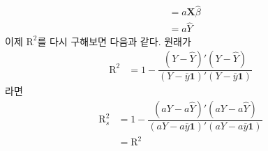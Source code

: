 \documentclass[answers]{exam}
\begin{document}
\begin{questions}
\begin{solution}
\begin{enumerate}[(a)]
\begin{align}
          &=a\mathbf{X}\widehat{\beta}\\
          &=a\widehat{Y}
        \end{align}
        이제 $\mathrm{R}^{2}$를 다시 구해보면 다음과 같다. 원래가
        \begin{align}
          \mathrm{R}^{2} &= 1-\dfrac{\left(Y-\widehat{Y}\right)'\left(Y-\widehat{Y}\right)}{\left(Y-\overline{y}\mathbf{1}\right)'\left(Y-\overline{y}\mathbf{1}\right)}
        \end{align}
        라면
        \begin{align}
          \mathrm{R}_{s}^{2} &= 1-\dfrac{\left(aY-a\widehat{Y}\right)'\left(aY-a\widehat{Y}\right)}{\left(aY-a\overline{y}\mathbf{1}\right)'\left(aY-a\overline{y}\mathbf{1}\right)}\\
          &=\mathrm{R}^{2}
        \end{align}
      \end{enumerate}
    \end{solution}
\end{questions}
\end{document}
